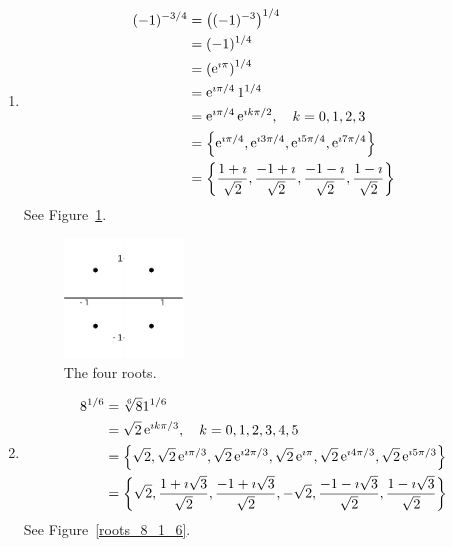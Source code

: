 {%
\begin{Solution}
  \label{solution -1 -3/4 8 1/6}
  \begin{enumerate}
  \item
    \begin{align*}
      (- 1)^{-3/4} 
      &= \left( (- 1)^{-3} \right)^{1/4} 
      \\
      &= (- 1)^{1/4} 
      \\
      &= \left( \mathop{\mathrm{e}}\nolimits^{\imath \pi} \right)^{1/4} 
      \\
      &= \mathop{\mathrm{e}}\nolimits^{\imath \pi / 4} 1^{1/4} 
      \\
      &= \mathop{\mathrm{e}}\nolimits^{\imath \pi / 4} \mathop{\mathrm{e}}\nolimits^{\imath k \pi / 2}, \quad k = 0,1,2,3 
      \\
      &= \left\{ \mathop{\mathrm{e}}\nolimits^{\imath \pi / 4}, \mathop{\mathrm{e}}\nolimits^{\imath 3 \pi / 4}, \mathop{\mathrm{e}}\nolimits^{\imath 5 \pi / 4}, \mathop{\mathrm{e}}\nolimits^{\imath 7 \pi / 4} \right\} 
      \\
      &= \left\{ \frac{1 + \imath}{\sqrt{2}}, \frac{- 1 + \imath}{\sqrt{2}},
        \frac{-1 - \imath}{\sqrt{2}}, \frac{1 - \imath}{\sqrt{2}} \right\}
    \end{align*}
    See Figure~\ref{roots_1_3_4}.

    \begin{figure}[h!]
      \begin{center}
        \includegraphics[width=0.3\textwidth]{fcv/number/roots_1_3_4}
      \end{center}
      \caption{The four roots.}
      \label{roots_1_3_4}
    \end{figure}
  \item
    \begin{align*}
      8^{1/6}
      &= \sqrt[6]{8} 1^{1/6} 
      \\
      &= \sqrt{2} \mathop{\mathrm{e}}\nolimits^{\imath k \pi / 3}, \quad k = 0,1,2,3,4,5 
      \\
      &= \left\{ \sqrt{2}, 
        \sqrt{2} \mathop{\mathrm{e}}\nolimits^{\imath \pi / 3},
        \sqrt{2} \mathop{\mathrm{e}}\nolimits^{\imath 2 \pi / 3},
        \sqrt{2} \mathop{\mathrm{e}}\nolimits^{\imath \pi},
        \sqrt{2} \mathop{\mathrm{e}}\nolimits^{\imath 4 \pi / 3},
        \sqrt{2} \mathop{\mathrm{e}}\nolimits^{\imath 5 \pi / 3} \right\} 
      \\
      &= \left\{ \sqrt{2},
        \frac{1 + \imath \sqrt{3}}{\sqrt{2}},
        \frac{-1 + \imath \sqrt{3}}{\sqrt{2}},
        - \sqrt{2},
        \frac{-1 - \imath \sqrt{3}}{\sqrt{2}},
        \frac{1 - \imath \sqrt{3}}{\sqrt{2}} \right\}
    \end{align*}
    See Figure~\ref{roots_8_1_6}.


\end{enumerate}
\end{Solution}}
